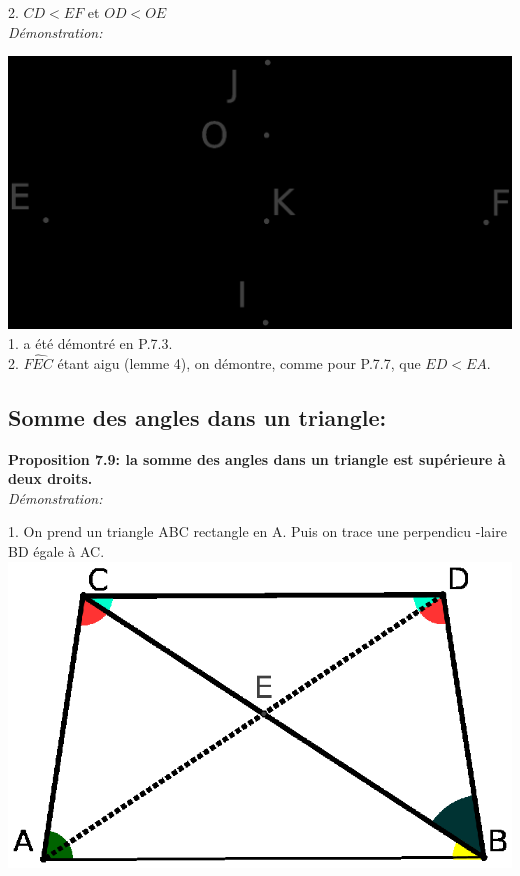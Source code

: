 \documentclass[a4paper, 12pt, twoside]{book}
\begin{document}
2. $CD<EF$ et $OD<OE$\\

\textit{Démonstration:}\


 \includegraphics[scale=0.3]{figures/sacc150.eps}\\

1. a été démontré en P.7.3.\\

2. $\hat{FEC}$ étant aigu (lemme 4), on démontre, comme pour P.7.7, que $ED<EA$.\\
 
 

 
 
    
    
    
  \subsection{Somme des angles dans un triangle:}
      
 
   
  \textbf{ Proposition 7.9: la somme des angles dans un triangle est supérieure à deux droits.} \\
  
   \textit{Démonstration:}\
    
  1.  On prend un triangle ABC rectangle en A. Puis on trace une perpendicu -laire  BD égale à AC.\\
    
           \includegraphics[scale=0.7]{figures/saccH2c.eps}\\
     
\end{document}
